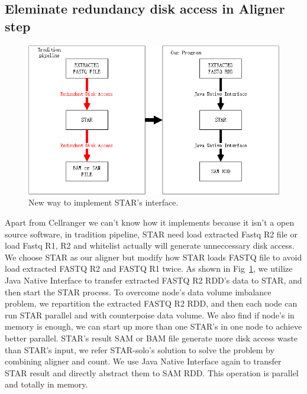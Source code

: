 \documentclass[runningheads]{llncs}
\begin{document}
\subsection{Eleminate redundancy disk access in Aligner step}
\begin{figure}
  \includegraphics[width=\textwidth]{fig2.png}
  \caption{New way to implement STAR's interface.} \label{fig2}
\end{figure}
Apart from Cellranger we can't know how it implements because it isn't a open source software, in tradition pipeline, STAR need load extracted Fastq R2 file or load Fastq R1, R2 and whitelist actually will generate unneccessary disk access.  
We choose STAR as our aligner but modify how STAR loads FASTQ file to avoid load extracted FASTQ R2 and FASTQ R1 twice. 
As shown in Fig~\ref{fig2}, we utilize Java Native Interface to transfer extracted FASTQ R2 RDD's data to STAR, and then start the STAR process.
To overcome node's data volume imbalance problem, we repartition the extracted FASTQ R2 RDD, and then each node can run STAR parallel and with counterpoise data volume.
We also find if node's in memory is enough, we can start up more than one STAR's in one node to achieve better parallel.
STAR's result SAM or BAM file generate more disk access waste than STAR's input, we refer STAR-solo's solution to solve the problem by combining aligner and count.
We use Java Native Interface again to transfer STAR result and directly abstract them to SAM RDD.
This operation is parallel and totally in memory.
\end{document}
